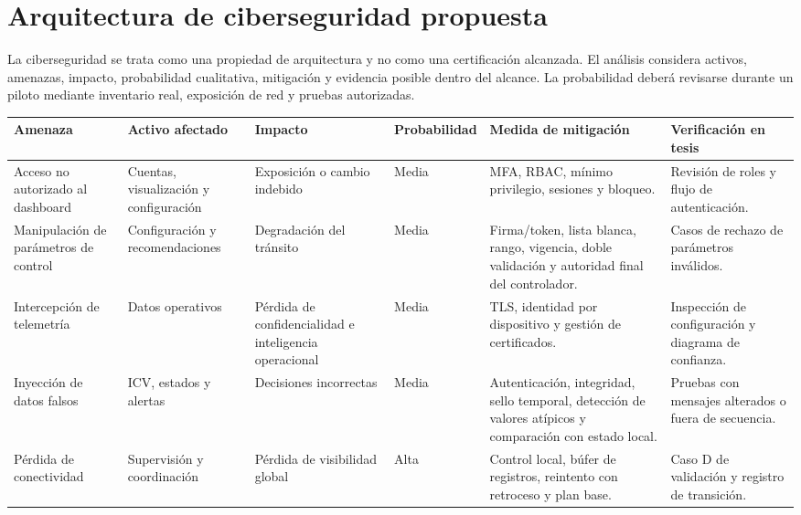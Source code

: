 \documentclass[12pt,a4paper,oneside]{report}
\begin{document}
\section{Arquitectura de ciberseguridad propuesta}\label{arquitectura-ciberseguridad-v2}

La ciberseguridad se trata como una propiedad de arquitectura y no como una certificación alcanzada. El análisis considera activos, amenazas, impacto, probabilidad cualitativa, mitigación y evidencia posible dentro del alcance. La probabilidad deberá revisarse durante un piloto mediante inventario real, exposición de red y pruebas autorizadas.

\begin{landscape}
\footnotesize
{}
\label{tbl:amenazas-v2}
\begin{longtable}{@{}p{4.0cm}p{3.4cm}p{3.2cm}p{2.2cm}p{6.0cm}p{4.0cm}@{}}
\toprule
\textbf{Amenaza} & \textbf{Activo afectado} & \textbf{Impacto} & \textbf{Probabilidad} & \textbf{Medida de mitigación} & \textbf{Verificación en tesis}\\
\midrule
\endhead
Acceso no autorizado al dashboard & Cuentas, visualización y configuración & Exposición o cambio indebido & Media & MFA, RBAC, mínimo privilegio, sesiones y bloqueo. & Revisión de roles y flujo de autenticación.\\
Manipulación de parámetros de control & Configuración y recomendaciones & Degradación del tránsito & Media & Firma/token, lista blanca, rango, vigencia, doble validación y autoridad final del controlador. & Casos de rechazo de parámetros inválidos.\\
Intercepción de telemetría & Datos operativos & Pérdida de confidencialidad e inteligencia operacional & Media & TLS, identidad por dispositivo y gestión de certificados. & Inspección de configuración y diagrama de confianza.\\
Inyección de datos falsos & ICV, estados y alertas & Decisiones incorrectas & Media & Autenticación, integridad, sello temporal, detección de valores atípicos y comparación con estado local. & Pruebas con mensajes alterados o fuera de secuencia.\\
Pérdida de conectividad & Supervisión y coordinación & Pérdida de visibilidad global & Alta & Control local, búfer de registros, reintento con retroceso y plan base. & Caso D de validación y registro de transición.\\

\end{longtable}
\end{landscape}
\end{document}
